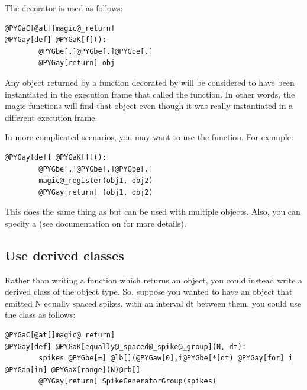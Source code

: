\documentclass[letterpaper,10pt,english]{manual}
\begin{document}
The \hyperlink{brian.magic_return}{} decorator is used as follows:

\begin{Verbatim}[commandchars=@\[\]]
@PYGaC[@at[]magic@_return]
@PYGay[def] @PYGaK[f]():
        @PYGbe[.]@PYGbe[.]@PYGbe[.]
        @PYGay[return] obj
\end{Verbatim}

Any object returned by a function decorated by \hyperlink{brian.magic_return}{} will be
considered to have been instantiated in the execution frame that called the
function. In other words, the magic functions will find that object even
though it was really instantiated in a different execution frame.

In more complicated scenarios, you may want to use the \hyperlink{brian.magic_register}{}
function. For example:

\begin{Verbatim}[commandchars=@\[\]]
@PYGay[def] @PYGaK[f]():
        @PYGbe[.]@PYGbe[.]@PYGbe[.]
        magic@_register(obj1, obj2)
        @PYGay[return] (obj1, obj2)
\end{Verbatim}

This does the same thing as \hyperlink{brian.magic_return}{} but can be used with
multiple objects. Also, you can specify a  (see documentation on
\hyperlink{brian.magic_register}{} for more details).

\subsection{Use derived classes}

Rather than writing a function which returns an object, you could instead
write a derived class of the object type. So, suppose you wanted to have an
object that emitted N equally spaced spikes, with an interval dt between
them, you could use the \hyperlink{brian.SpikeGeneratorGroup}{} class as follows:

\begin{Verbatim}[commandchars=@\[\]]
@PYGaC[@at[]magic@_return]
@PYGay[def] @PYGaK[equally@_spaced@_spike@_group](N, dt):
        spikes @PYGbe[=] @lb[](@PYGaw[0],i@PYGbe[*]dt) @PYGay[for] i @PYGan[in] @PYGaX[range](N)@rb[]
        @PYGay[return] SpikeGeneratorGroup(spikes)
\end{Verbatim}
\end{document}
